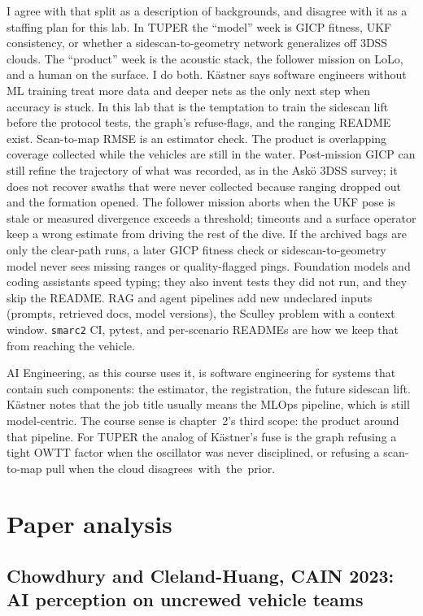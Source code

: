 \documentclass[11pt,a4paper,twocolumn]{amsart}
\begin{document}
I agree with that split as a description of backgrounds, and disagree with it as a staffing plan for this lab. In TUPER the ``model'' week is GICP fitness, UKF consistency, or whether a sidescan-to-geometry network generalizes off 3DSS clouds. The ``product'' week is the acoustic stack, the follower mission on LoLo, and a human on the surface. I do both. K\"{a}stner says software engineers without ML training treat more data and deeper nets as the only next step when accuracy is stuck. In this lab that is the temptation to train the sidescan lift before the protocol tests, the graph's refuse-flags, and the ranging README exist. Scan-to-map RMSE is an estimator check. The product is overlapping coverage collected while the vehicles are still in the water. Post-mission GICP can still refine the trajectory of what was recorded, as in the Ask\"{o} 3DSS survey; it does not recover swaths that were never collected because ranging dropped out and the formation opened. The follower mission aborts when the UKF pose is stale or measured divergence exceeds a threshold; timeouts and a surface operator keep a wrong estimate from driving the rest of the dive. If the archived bags are only the clear-path runs, a later GICP fitness check or sidescan-to-geometry model never sees missing ranges or quality-flagged pings. Foundation models and coding assistants speed typing; they also invent tests they did not run, and they skip the README. RAG and agent pipelines add new undeclared inputs (prompts, retrieved docs, model versions), the Sculley problem with a context window. \texttt{smarc2} CI, pytest, and per-scenario READMEs are how we keep that from reaching the vehicle.

AI Engineering, as this course uses it, is software engineering for systems that contain such components: the estimator, the registration, the future sidescan lift. K\"{a}stner notes that the job title usually means the MLOps pipeline, which is still model-centric. The course sense is chapter~2's third scope: the product around that pipeline. For TUPER the analog of K\"{a}stner's fuse is the graph refusing a tight OWTT factor when the oscillator was never disciplined, or refusing a scan-to-map pull when the cloud \mbox{disagrees with the prior.}

\section{Paper analysis}
\label{sec:papers}

\subsection{Chowdhury and Cleland-Huang, CAIN 2023: AI perception on uncrewed vehicle teams}
\label{sec:cain}
\end{document}
